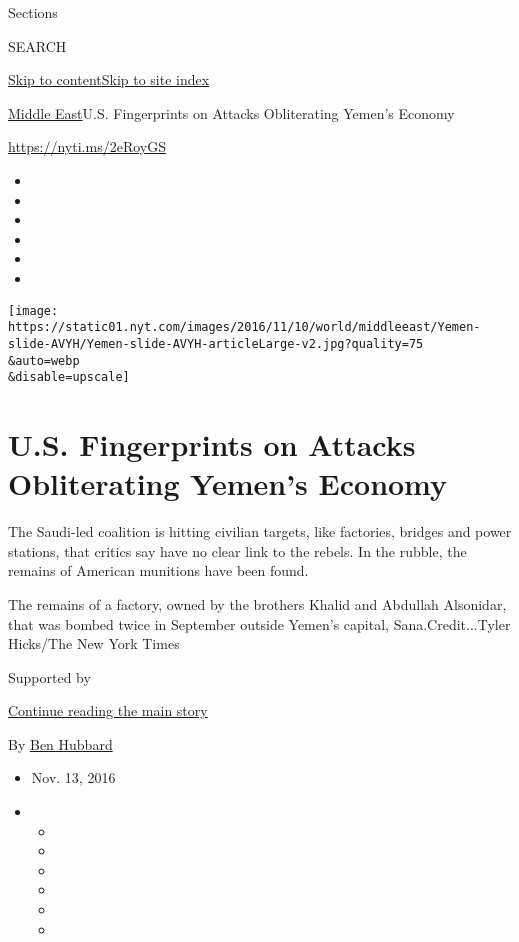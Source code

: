 Sections

SEARCH

\protect\hyperlink{site-content}{Skip to
content}\protect\hyperlink{site-index}{Skip to site index}

\href{/section/world/middleeast}{Middle East}\textbar{}U.S. Fingerprints
on Attacks Obliterating Yemen's Economy

\url{https://nyti.ms/2eRoyGS}

\begin{itemize}
\item
\item
\item
\item
\item
\item
\end{itemize}

\texttt{[image: https://static01.nyt.com/images/2016/11/10/world/middleeast/Yemen-slide-AVYH/Yemen-slide-AVYH-articleLarge-v2.jpg?quality=75\\\&auto=webp\\\&disable=upscale]}

\hypertarget{us-fingerprints-on-attacks-obliterating-yemens-economy}{%
\section{U.S. Fingerprints on Attacks Obliterating Yemen's
Economy}\label{us-fingerprints-on-attacks-obliterating-yemens-economy}}

The Saudi-led coalition is hitting civilian targets, like factories,
bridges and power stations, that critics say have no clear link to the
rebels. In the rubble, the remains of American munitions have been
found.

The remains of a factory, owned by the brothers Khalid and Abdullah
Alsonidar, that was bombed twice in September outside Yemen's capital,
Sana.Credit...Tyler Hicks/The New York Times

Supported by

\protect\hyperlink{after-sponsor}{Continue reading the main story}

By \href{http://www.nytimes.com/by/ben-hubbard}{Ben Hubbard}

\begin{itemize}
\item
  Nov. 13, 2016
\item
  \begin{itemize}
  \item
  \item
  \item
  \item
  \item
  \item
  \end{itemize}
\end{itemize}

